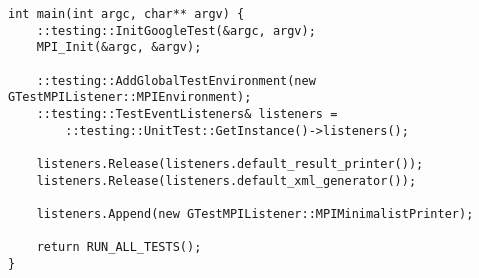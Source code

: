 \documentclass{report}
\begin{document}
\begin{lstlisting}
int main(int argc, char** argv) {
    ::testing::InitGoogleTest(&argc, argv);
    MPI_Init(&argc, &argv);

    ::testing::AddGlobalTestEnvironment(new GTestMPIListener::MPIEnvironment);
    ::testing::TestEventListeners& listeners =
        ::testing::UnitTest::GetInstance()->listeners();

    listeners.Release(listeners.default_result_printer());
    listeners.Release(listeners.default_xml_generator());

    listeners.Append(new GTestMPIListener::MPIMinimalistPrinter);

    return RUN_ALL_TESTS();
}

\end{lstlisting}
\end{document}
